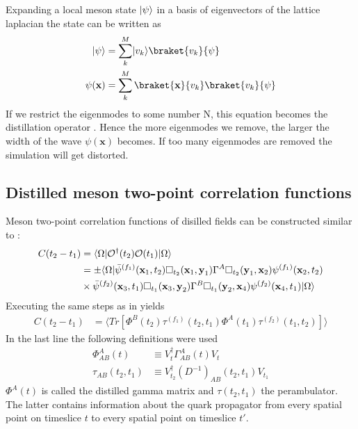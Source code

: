     Expanding a local meson state $\lvert\psi\rangle$ in a basis of eigenvectors of the lattice laplacian the state can be written as
    \begin{equation}
        \begin{aligned}
            \ket{\psi} &= \sum_k^M \ket{v_k}\braket{v_k}{\psi}\\
            \psi(\textbf{x}) &= \sum_k^M \braket{\textbf{x}}{v_k}\braket{v_k}{\psi}
        \end{aligned}
    \end{equation}
    If we restrict the eigenmodes to some number N, this equation becomes the distillation operator . Hence the more eigenmodes we remove, the larger the width of the wave $\psi(\textbf{x})$ becomes. If too many eigenmodes are removed the simulation will get distorted.
    
\subsection{Distilled meson two-point correlation functions}
    Meson two-point correlation functions of disilled fields can be constructed similar to :
    \begin{equation}
        \begin{aligned}
            C(t_2 - t_1) &= \langle\Omega| \mathcal{O}^\dagger(t_2) \mathcal{O}(t_1)|\Omega\rangle\\
            &= \pm\langle\Omega| \bar{\psi}^{(f_1)}(\textbf{x}_1,t_2)\Box_{t_2}(\textbf{x}_1,\textbf{y}_1)\Gamma^A
            \Box_{t_2}(\textbf{y}_1,\textbf{x}_2)\psi^{(f_1)}(\textbf{x}_2,t_2)\\
            &\times \bar{\psi}^{(f_2)}(\textbf{x}_3,t_1)\Box_{t_1}(\textbf{x}_3,\textbf{y}_2)\Gamma^B
            \Box_{t_1}(\textbf{y}_2,\textbf{x}_4)\psi^{(f_2)}(\textbf{x}_4,t_1) |\Omega\rangle
        \end{aligned}
    \end{equation}
    \noindent
    Executing the same steps as in  yields
    \begin{equation}
        \begin{aligned}
            C(t_2 - t_1) &= \langle Tr[\Phi^B(t_2)\tau^{(f_1)}(t_2,t_1)\Phi^A(t_1)\tau^{(f_2)}(t_1,t_2)] \rangle
        \end{aligned}
    \end{equation}
    In the last line the following definitions were used
    \begin{equation}
        \begin{aligned}\label{def_gamma_and_perambulator}
            \Phi_{AB}^A(t) &\equiv V_{t}^\dagger\Gamma_{AB}^A(t)V_t\\
            \tau_{AB}(t_2,t_1) &\equiv V_{t_2}^\dagger(D^{-1})_{AB}(t_2,t_1)V_{t_1}
        \end{aligned}
    \end{equation}
    $\Phi^A(t)$ is called the distilled gamma matrix and $\tau(t_2,t_1)$ the perambulator. The latter contains information about the quark propagator from every spatial point on timeslice $t$ to every spatial point on timeslice $t'$.
    
